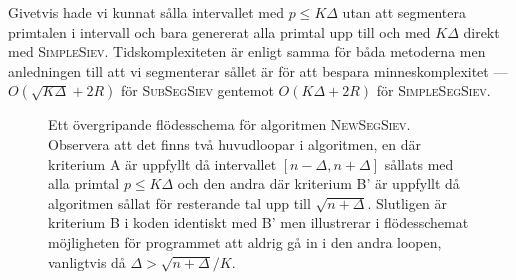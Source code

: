 Givetvis hade vi kunnat sålla intervallet med \(p \leq K \Delta\) utan att segmentera primtalen i intervall och bara genererat alla primtal upp till och med \(K \Delta\) direkt med \textsc{SimpleSiev}. Tidskomplexiteten är enligt \cite{HaraldSieve} samma för båda metoderna men anledningen till att vi segmenterar sållet är för att bespara minneskomplexitet --- \(O(\sqrt{K \Delta} + 2R)\) för \textsc{SubSegSiev} gentemot \(O(K \Delta + 2R)\) för \textsc{SimpleSegSiev}. 


\begin{figure}
    \centering
    
    \caption{Ett övergripande flödesschema för algoritmen \textsc{NewSegSiev}. Observera att det finns två huvudloopar i algoritmen, en där kriterium A är uppfyllt då intervallet \([n - \Delta, n + \Delta]\) sållats med alla primtal \(p \leq K \Delta\) och den andra där kriterium B' är uppfyllt då algoritmen sållat för resterande tal upp till \(\sqrt{n + \Delta}\). Slutligen är kriterium B i koden identiskt med B' men illustrerar i flödesschemat möjligheten för programmet att aldrig gå in i den andra loopen, vanligtvis då \(\Delta > \sqrt{n + \Delta}/K\).}
    \label{fig:flowchart}
\end{figure}



